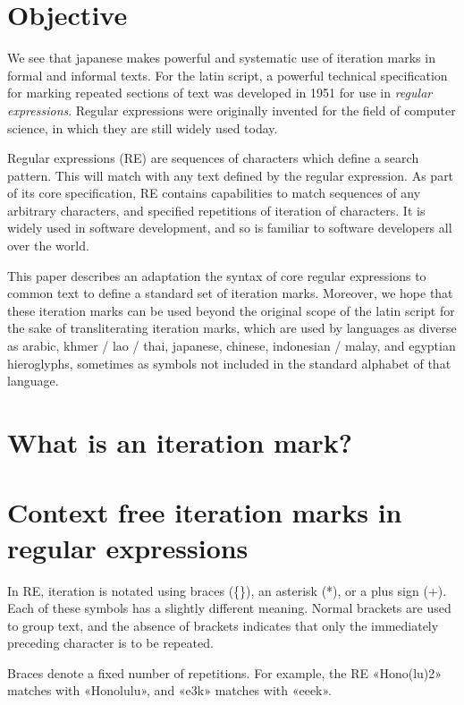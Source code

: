 \documentclass{article}
\begin{document}
\section{Objective}

We see that japanese makes powerful and systematic use of iteration marks
in formal and informal texts. For the latin script, a powerful technical
specification for marking repeated sections of text was developed in 1951
for use in \textit{regular expressions}. Regular expressions were originally
invented for the field of computer science, in which they are still widely used
today.

Regular expressions (RE) are sequences of characters which define a search
pattern. This will match with any text defined by the regular expression. As
part of its core specification, RE contains capabilities to match sequences
of any arbitrary characters, and specified repetitions of iteration of
characters. It is widely used in software development, and so is familiar to
software developers all over the world.

This paper describes an adaptation the syntax of core regular expressions to
common text to define a standard set of iteration marks. Moreover, we hope that
these iteration marks can be used beyond the original scope of the latin script
for the sake of transliterating iteration marks, which are used by languages as
diverse as arabic, khmer / lao / thai, japanese, chinese, indonesian / malay,
and egyptian hieroglyphs, sometimes as symbols not included in the standard
alphabet of that language.

\section{What is an iteration mark?}

\section{Context free iteration marks in regular expressions}

In RE, iteration is notated using braces (\{\}), an asterisk (*), or a plus sign
(+). Each of these symbols has a slightly different meaning. Normal brackets are
used to group text, and the absence of brackets indicates that only the
immediately preceding character is to be repeated.

Braces denote a fixed number of repetitions. For example, the RE «Hono(lu){2}»
matches with «Honolulu», and «e{3}k» matches with «eeek».
\end{document}
